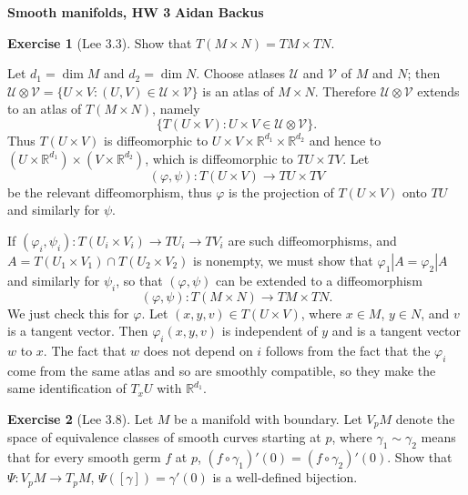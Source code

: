 \documentclass[10pt]{article}
\newcommand{\RR}{\mathbb{R}}
\theoremstyle{definition}
\newtheorem{exer}{Exercise}
\begin{document}
\noindent
\large\textbf{Smooth manifolds, HW 3} \hfill \textbf{Aidan Backus} \\


\begin{exer}[Lee 3.3]
Show that $T(M \times N) = TM \times TN$.
\end{exer}

Let $d_1 = \dim M$ and $d_2 = \dim N$.
Choose atlases $\mathcal U$ and $\mathcal V$ of $M$ and $N$; then $\mathcal U \otimes \mathcal V = \{U \times V: (U, V) \in \mathcal U \times \mathcal V\}$ is an atlas of $M \times N$.
Therefore $\mathcal U \otimes \mathcal V$ extends to an atlas of $T(M \times N)$, namely
$$\{T(U \times V): U \times V \in \mathcal U \otimes \mathcal V\}.$$
Thus $T(U \times V)$ is diffeomorphic to $U \times V \times \RR^{d_1} \times \RR^{d_2}$ and hence to $(U \times \RR^{d_1}) \times (V \times \RR^{d_2})$, which is diffeomorphic to $TU \times TV$.
Let
$$(\varphi, \psi): T(U \times V) \to TU \times TV$$
be the relevant diffeomorphism, thus $\varphi$ is the projection of $T(U \times V)$ onto $TU$ and similarly for $\psi$.

If $(\varphi_i, \psi_i): T(U_i \times V_i) \to TU_i \to TV_i$ are such diffeomorphisms, and $A = T(U_1 \times V_1) \cap T(U_2 \times V_2)$ is nonempty, we must show that $\varphi_1|A = \varphi_2|A$ and similarly for $\psi_i$, so that $(\varphi, \psi)$ can be extended to a diffeomorphism
$$(\varphi, \psi): T(M \times N) \to TM \times TN.$$
We just check this for $\varphi$. Let $(x, y, v) \in T(U \times V)$, where $x \in M$, $y \in N$, and $v$ is a tangent vector.
Then $\varphi_i(x, y, v)$ is independent of $y$ and is a tangent vector $w$ to $x$.
The fact that $w$ does not depend on $i$ follows from the fact that the $\varphi_i$ come from the same atlas and so are smoothly compatible, so they make the same identification of $T_xU$ with $\RR^{d_1}$.

\begin{exer}[Lee 3.8]
Let $M$ be a manifold with boundary.
Let $V_pM$ denote the space of equivalence classes of smooth curves starting at $p$, where $\gamma_1 \sim \gamma_2$ means that for every smooth germ $f$ at $p$, $(f \circ \gamma_1)'(0) = (f \circ \gamma_2)'(0)$.
Show that $\Psi: V_pM \to T_pM$, $\Psi([\gamma]) = \gamma'(0)$ is a well-defined bijection.
\end{exer}
\end{document}
